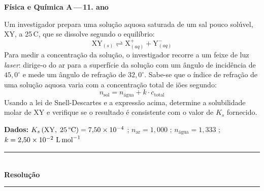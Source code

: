 \documentclass[12pt,a4paper]{article}
\begin{document}
\begin{center}
  {\small\textcolor{azul}{\textbf{F\'isica e Qu\'imica A\,---\,11.\textordmasculine{} ano}}}
\end{center}

\bigskip

\begin{mdframed}[style=enunciado]

Um investigador prepara uma solu\c{c}\~ao aquosa saturada de um sal pouco
sol\'uvel, XY, a 25\,\textdegree C, que se dissolve segundo o equil\'ibrio:
\[
  \mathrm{XY}_{(s)} \rightleftharpoons \mathrm{X}^{+}_{(aq)}
  + \mathrm{Y}^{-}_{(aq)}
\]
Para medir a concentra\c{c}\~ao da solu\c{c}\~ao, o investigador recorre a um
feixe de luz \textit{laser}: dirige-o do ar para a superf\'icie da solu\c{c}\~ao
com um \^angulo de incid\^encia de $45{,}0^\circ$ e mede um \^angulo de
refra\c{c}\~ao de $32{,}0^\circ$. Sabe-se que o \'indice de refra\c{c}\~ao de
uma solu\c{c}\~ao aquosa varia com a concentra\c{c}\~ao total de i\~oes segundo:
\[
  n_{\text{sol}} = n_{\text{\'{a}gua}} + k \cdot c_{\text{total}}
\]
Usando a lei de Snell-Descartes e a express\~ao acima, determine a
solubilidade molar de XY e verifique se o resultado \'e consistente com
o valor de $K_s$ fornecido.

\end{mdframed}

\medskip

\begin{mdframed}[style=dados]
\textbf{Dados:}
\quad $K_s\,(\mathrm{XY},\;25\,\text{\textdegree C}) = 7{,}50 \times 10^{-4}$
\quad;\quad
$n_{\text{ar}} = 1{,}000$
\quad;\quad
$n_{\text{\'{a}gua}} = 1{,}333$
\quad;\quad
$k = 2{,}50 \times 10^{-2}\ \text{L\,mol}^{-1}$
\end{mdframed}

\bigskip\bigskip

\noindent\textcolor{verde}{\rule{\linewidth}{0.5pt}}\\[4pt]
{\textcolor{verde}{\textbf{Resolu\c{c}\~ao}}}\\[-2pt]
\noindent\textcolor{verde}{\rule{\linewidth}{0.5pt}}

\bigskip
\end{document}
